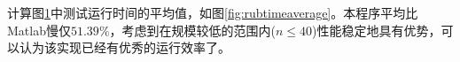 \documentclass[a4paper,twoside]{article}
\begin{document}
\begin{spacing}{1.2}
\begin{figure}[h]
	
	\label{fig:runtimeton}
\end{figure}

计算图\ref{fig:runtimeton}中测试运行时间的平均值，如图\ref{fig:rubtimeaverage}。本程序平均比Matlab慢仅$51.39 \%$，考虑到在规模较低的范围内($n\le40$)性能稳定地具有优势，可以认为该实现已经有优秀的运行效率了。


\end{spacing}
\end{document}

